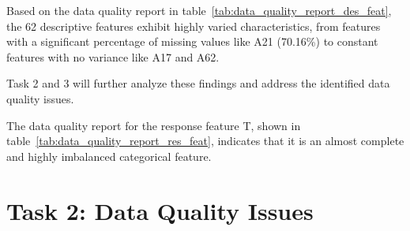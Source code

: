 \documentclass[11pt]{report}
\begin{document}
Based on the data quality report in table~\ref{tab:data_quality_report_des_feat}, the 62 descriptive features exhibit highly varied characteristics,
from features with a significant percentage of missing values like A21 (70.16\%) to constant features with no variance like A17 and A62.

Task 2 and 3 will further analyze these findings and address the identified data quality issues.

\begin{table}[H]
\centering
\caption{Data Quality Report for the Response Feature.}
\label{tab:data_quality_report_res_feat}
\end{table}

The data quality report for the response feature T, shown in table~\ref{tab:data_quality_report_res_feat}, indicates that it is an almost complete and highly imbalanced categorical feature.


\section*{Task 2: Data Quality Issues}
\end{document}
